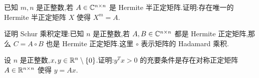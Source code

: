 \begin{problem}[选做]
已知 $m,n$ 是正整数,若 $A\in\mathbb{C}^{n\times n}$ 是 Hermite 半正定矩阵.证明:存在唯一的 Hermite 半正定矩阵 $X$ 使得 $X^m=A$.
\begin{solution}

\end{solution}
\end{problem}

\begin{problem}[选做]
证明 Schur 乘积定理:已知 $n$ 是正整数,若 $A,B\in\mathbb{C}^{n\times n}$ 都是 Hermite 正定矩阵,那么 $C=A\circ B$ 也是 Hermite 正定矩阵.这里 $\circ$ 表示矩阵的 Hadamard 乘积.
\begin{solution}

\end{solution}
\end{problem}

\begin{problem}[选做]
设 $n$ 是正整数,$x,y\in\mathbb{R}^n\setminus\{0\}$.证明:$y^Tx>0$ 的充要条件是存在对称正定矩阵 $A\in\mathbb{R}^{n\times n}$ 使得 $y=Ax$.
\begin{solution}

\end{solution}
\end{problem}
